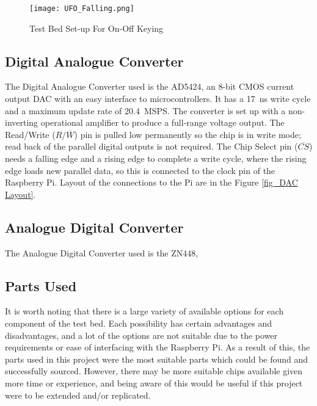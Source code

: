 \documentclass[../main.tex]{subfiles}
\begin{document}

\begin{figure}[ht]
	\centering
	\texttt{[image: UFO\_Falling.png]}
	\caption{Test Bed Set-up For On-Off Keying}
	\label{fig_OOK Architecture}
\end{figure}

\subsection{Digital Analogue Converter}

The Digital Analogue Converter used is the AD5424, an 8-bit CMOS current output DAC with an easy interface to microcontrollers.
It has a \SI{17}{\nano\second} write cycle and a maximum update rate of \SI{20.4}{MSPS}. %
The converter is set up with a non-inverting operational amplifier to produce a full-range voltage output.
The Read/Write ($R/\overline{W}$) pin is pulled low permanently so the chip is in write mode; read back of the parallel digital outputs is not required.
The Chip Select pin ($\overline{CS}$) needs a falling edge and a rising edge to complete a write cycle, where the rising edge loads new parallel data, so this is connected to the clock pin of the Raspberry Pi.
Layout of the connections to the Pi are in the Figure \ref{fig_DAC Layout}.\\

 \label{fig_DAC Layout}

\subsection{Analogue Digital Converter}

The Analogue Digital Converter used is the ZN448, 

\subsection{Parts Used}

It is worth noting that there is a large variety of available options for each component of the test bed.
Each possibility has certain advantages and disadvantages, and a lot of the options are not suitable due to the power requirements or ease of interfacing with the Raspberry Pi.
As a result of this, the parts used in this project were the most suitable parts which could be found and successfully sourced.
However, there may be more suitable chips available given more time or experience, and being aware of this would be useful if this project were to be extended and/or replicated.\\
\end{document}

